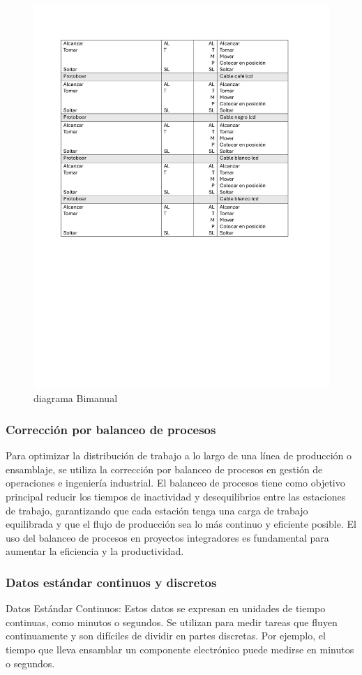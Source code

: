 \begin{figure}[H]
    \centering
    \includegraphics[scale=0.22]{13/img/diagramaBimanualTres.pdf}
    \caption{diagrama Bimanual}
    \label{fig:diagramaBimanual}
\end{figure}
% 
\subsubsection{Corrección por balanceo de procesos}
% 
Para optimizar la distribución de trabajo a lo largo de una línea de producción o ensamblaje, se utiliza la corrección por balanceo de procesos en gestión de operaciones e ingeniería industrial. El balanceo de procesos tiene como objetivo principal reducir los tiempos de inactividad y desequilibrios entre las estaciones de trabajo, garantizando que cada estación tenga una carga de trabajo equilibrada y que el flujo de producción sea lo más continuo y eficiente posible. El uso del balanceo de procesos en proyectos integradores es fundamental para aumentar la eficiencia y la productividad.
% 
\subsubsection{Datos estándar continuos y discretos}
% 
% 
Datos Estándar Continuos: Estos datos se expresan en unidades de tiempo continuas, como minutos o segundos. Se utilizan para medir tareas que fluyen continuamente y son difíciles de dividir en partes discretas. Por ejemplo, el tiempo que lleva ensamblar un componente electrónico puede medirse en minutos o segundos.

